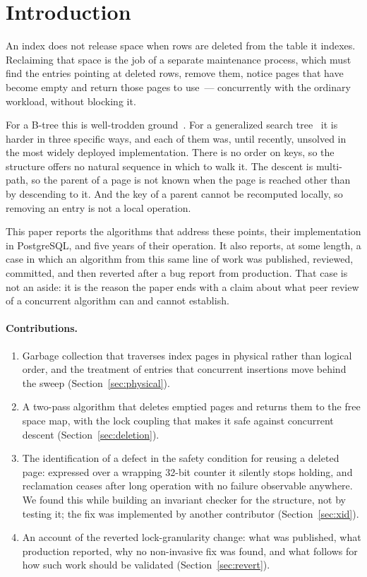 \section{Introduction}

An index does not release space when rows are deleted from the table it
indexes. Reclaiming that space is the job of a separate maintenance process,
which must find the entries pointing at deleted rows, remove them, notice pages
that have become empty and return those pages to use~--- concurrently with the
ordinary workload, without blocking it.

For a B-tree this is well-trodden ground~\cite{graefe2011modern}. For a
generalized search tree~\cite{hellerstein1995generalized} it is harder in three
specific ways, and each of them was, until recently, unsolved in the most
widely deployed implementation. There is no order on keys, so the structure
offers no natural sequence in which to walk it. The descent is multi-path, so
the parent of a page is not known when the page is reached other than by
descending to it. And the key of a parent cannot be recomputed locally, so
removing an entry is not a local operation.

This paper reports the algorithms that address these points, their
implementation in PostgreSQL, and five years of their operation. It also
reports, at some length, a case in which an algorithm from this same line of
work was published, reviewed, committed, and then reverted after a bug report
from production. That case is not an aside: it is the reason the paper ends
with a claim about what peer review of a concurrent algorithm can and cannot
establish.

\paragraph{Contributions.}

\begin{enumerate}
\item Garbage collection that traverses index pages in physical rather than
      logical order, and the treatment of entries that concurrent insertions
      move behind the sweep (Section~\ref{sec:physical}).
\item A two-pass algorithm that deletes emptied pages and returns them to the
      free space map, with the lock coupling that makes it safe against
      concurrent descent (Section~\ref{sec:deletion}).
\item The identification of a defect in the safety condition for reusing a
      deleted page: expressed over a wrapping 32-bit counter it silently stops
      holding, and reclamation ceases after long operation with no failure
      observable anywhere. We found this while building an invariant checker for
      the structure, not by testing it; the fix was implemented by another
      contributor (Section~\ref{sec:xid}).
\item An account of the reverted lock-granularity change: what was published,
      what production reported, why no non-invasive fix was found, and what
      follows for how such work should be validated (Section~\ref{sec:revert}).
\end{enumerate}

